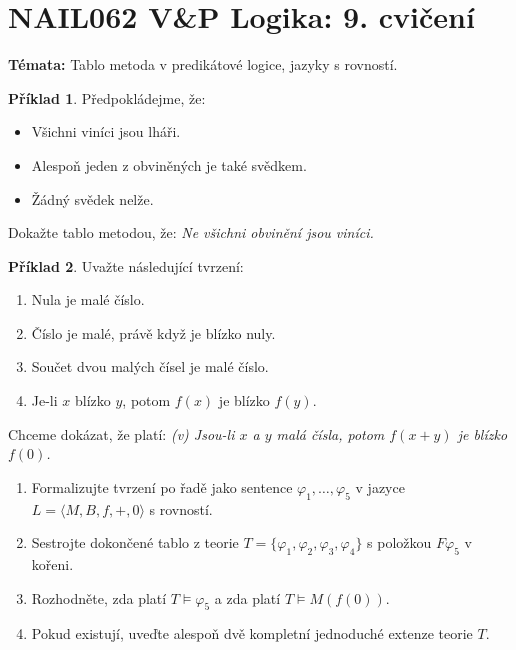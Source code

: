 \documentclass[a4paper]{article}
\theoremstyle{plain}
\theoremstyle{definition}
\newtheorem{problem}{Příklad}
\begin{document}
\section*{NAIL062 V\&P Logika: 9. cvičení}


\textbf{Témata:}
Tablo metoda v predikátové logice, jazyky s rovností.


\medskip\begin{problem}
    Předpokládejme, že:
    \begin{itemize}\it
    \item Všichni viníci jsou lháři.
    \item Alespoň jeden z obviněných je také svědkem.
    \item Žádný svědek nelže.
    \end{itemize}
    Dokažte tablo metodou, že: {\it Ne všichni obvinění jsou viníci.}
\end{problem} 
    

\medskip\begin{problem}
Uvažte následující tvrzení:
\begin{enumerate}[label=(\roman*)] \it 
    \item Nula je malé číslo.
    \item Číslo je malé, právě když je blízko nuly.
    \item Součet dvou malých čísel je malé číslo.
    \item Je-li $x$ blízko $y$, potom $f(x)$ je blízko $f(y)$.
\end{enumerate}
Chceme dokázat, že platí: {\it (v) Jsou-li $x$ a $y$ malá čísla, potom $f(x+y)$ je blízko $f(0)$.}

\begin{enumerate}
\item Formalizujte tvrzení po řadě jako sentence $\varphi_1,\dots,\varphi_5$ v jazyce $L=\langle M,B,f,+,0\rangle$ s rovností.
\item Sestrojte dokončené tablo z teorie $T=\{\varphi_1,\varphi_2,\varphi_3,\varphi_4\}$ s položkou $F\varphi_5$ v kořeni.
\item Rozhodněte, zda platí $T\models \varphi_5$ a zda platí $T\models M(f(0))$.

\item Pokud existují, uveďte alespoň dvě kompletní jednoduché extenze teorie $T$.
\end{enumerate}
\end{problem}
\end{document}
